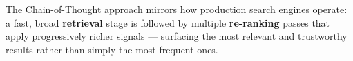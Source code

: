 \documentclass[12pt,a4paper]{article}
\begin{document}
\bigskip
\noindent
The Chain-of-Thought approach mirrors how production search engines operate:
a fast, broad \textbf{retrieval} stage is followed by multiple \textbf{re-ranking}
passes that apply progressively richer signals — surfacing the most relevant and
trustworthy results rather than simply the most frequent ones.
\end{document}
